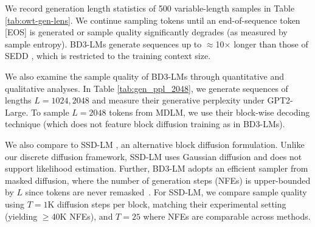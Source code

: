 \documentclass{article} %
\def\algos{BD3-LMs}
\def\algo{BD3-LM}
\begin{document}


We record generation length statistics of 500 variable-length samples in Table \ref{tab:owt-gen-lens}. We continue sampling tokens until an end-of-sequence token [EOS] is generated or sample quality significantly degrades (as measured by sample entropy). \algos{} generate sequences up to $\approx$10$\times$ longer than those of SEDD \citep{lou2024discrete}, which is restricted to the training context size.

We also examine the sample quality of \algos{} through quantitative and qualitative analyses. In Table \ref{tab:gen_ppl_2048}, we generate sequences of lengths $L=1024, 2048$ and measure their generative perplexity under GPT2-Large. To sample $L=2048$ tokens from MDLM, we use their block-wise decoding technique (which does not feature block diffusion training as in \algos{}).

We also compare to SSD-LM \citep{han2022ssd}, an alternative block diffusion formulation. Unlike our discrete diffusion framework, SSD-LM uses Gaussian diffusion and does not support likelihood estimation. Further, \algo{} adopts an efficient sampler from masked diffusion, where the number of generation steps (NFEs) is upper-bounded by $L$ since tokens are never remasked~\citep{sahoo2024simple, ou2025your}. For SSD-LM, we compare sample quality using $T=1$K diffusion steps per block, matching their experimental setting (yielding $\geq$40K NFEs), and $T=25$ where NFEs are comparable across methods.
\end{document}
